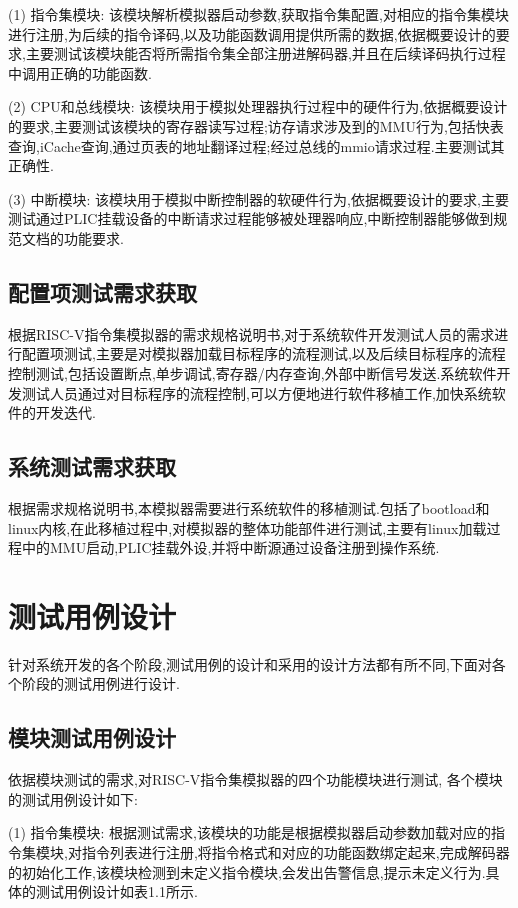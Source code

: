 (1) 指令集模块: 该模块解析模拟器启动参数,获取指令集配置,对相应的指令集模块进行注册,为后续的指令译码,以及功能函数调用提供所需的数据,依据概要设计的要求,主要测试该模块能否将所需指令集全部注册进解码器,并且在后续译码执行过程中调用正确的功能函数.


(2) CPU和总线模块: 该模块用于模拟处理器执行过程中的硬件行为,依据概要设计的要求,主要测试该模块的寄存器读写过程;访存请求涉及到的MMU行为,包括快表查询,iCache查询,通过页表的地址翻译过程;经过总线的mmio请求过程.主要测试其正确性.


(3) 中断模块: 该模块用于模拟中断控制器的软硬件行为,依据概要设计的要求,主要测试通过PLIC挂载设备的中断请求过程能够被处理器响应,中断控制器能够做到规范文档的功能要求.


\subsection{配置项测试需求获取}
根据RISC-V指令集模拟器的需求规格说明书,对于系统软件开发测试人员的需求进行配置项测试,主要是对模拟器加载目标程序的流程测试,以及后续目标程序的流程控制测试,包括设置断点,单步调试,寄存器/内存查询,外部中断信号发送.系统软件开发测试人员通过对目标程序的流程控制,可以方便地进行软件移植工作,加快系统软件的开发迭代.

\subsection{系统测试需求获取}
根据需求规格说明书,本模拟器需要进行系统软件的移植测试.包括了bootload和linux内核,在此移植过程中,对模拟器的整体功能部件进行测试,主要有linux加载过程中的MMU启动,PLIC挂载外设,并将中断源通过设备注册到操作系统.

\section{测试用例设计}
针对系统开发的各个阶段,测试用例的设计和采用的设计方法都有所不同,下面对各个阶段的测试用例进行设计.

\subsection{模块测试用例设计}
依据模块测试的需求,对RISC-V指令集模拟器的四个功能模块进行测试, 各个模块的测试用例设计如下:


(1) 指令集模块: 根据测试需求,该模块的功能是根据模拟器启动参数加载对应的指令集模块,对指令列表进行注册,将指令格式和对应的功能函数绑定起来,完成解码器的初始化工作,该模块检测到未定义指令模块,会发出告警信息,提示未定义行为.具体的测试用例设计如表1.1所示.


